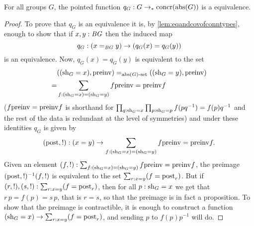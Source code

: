 \begin{lemma}
  \label{lem:Groupsareidentitytypes}%
For all groups $G$, the pointed function $q_G:G\to_*\mathrm{concr}(\mathrm{abs}(G))$ 
is a  equivalence.
\end{lemma}
\begin{proof}
  To prove that $q_G$ is an equivalence it is, by \cref{lem:eqandcovofconntypes}, enough to show that if $x,y:\mathit{B}\mathit{G}$ then the induced map
$$q_G:(x=_{\BG}y)\to (q_G(x)=q_G(y))%
$$
is an equivalence.
  Now, $q_G(x)=q_G(y)$ is equivalent to the set 
\begin{align*}
  &((\mathrm{sh}_G=x),\mathrm{preinv})=_{\mathrm{abs}(G)\text{-set}}((\mathrm{sh}_G=y),\mathrm{preinv})\\
=&\sum_{f:(\mathrm{sh}_G=x)=(\mathrm{sh}_G=y)}f\mathrm{preinv}=\mathrm{preinv} f
\end{align*}
 ($f\mathrm{preinv}=\mathrm{preinv} f$ is shorthand for $\prod_{q:\mathrm{sh}_G=x}\prod_{p:\mathrm{sh}_G=p}f(pq^{-1})=f(p)q^{-1}$ and the rest of the data is redundant at the level of symmetries) and under these identities $q_G$ is given by 
$$(\mathrm{post},!):(x=y)\to \sum_{f:(\mathrm{sh}_G=x)=(\mathrm{sh}_G=y)}f\mathrm{preinv}=\mathrm{preinv} f.$$
Given an element
$(f,!):\sum_{f:(\mathrm{sh}_G=x)=(\mathrm{sh}_G=y)}f\mathrm{preinv}=\mathrm{preinv} f$, the preimage 
$(\mathrm{post},!)^{-1}(f,!)$ is equivalent to the set
$\sum_{r:x=y}(f=\mathrm{post}_r)$.  But if $(r,!),(s,!): \sum_{r:x=y}(f=\mathrm{post}_r)$, then for all $p:\mathrm{sh}_G=x$ we get that $r\,p=f(p)=s\,p$, that is $r=s$, so that the preimage is in fact a proposition.  
To show that the preimage is contractible, it is enough to construct a function $(\mathrm{sh}_G=x)\to \sum_{r:x=y}(f=\mathrm{post}_r)$, and sending $p$ to $f(p)p^{-1}$ will do.
\end{proof}


